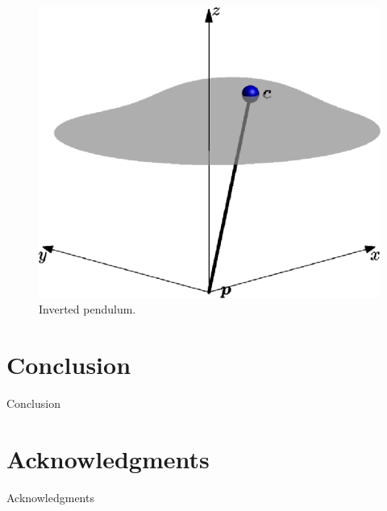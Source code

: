 \documentclass[letterpaper, 10 pt, conference]{ieeeconf}  %
\begin{document}
\begin{figure}[ht]
    \centerline{%
    \includegraphics{inverted_pendulum.eps}}
    \caption{Inverted pendulum.}
    \label{fig.pendulum}
\end{figure}



\section{Conclusion}

Conclusion


\section*{Acknowledgments}

Acknowledgments









\end{document}

